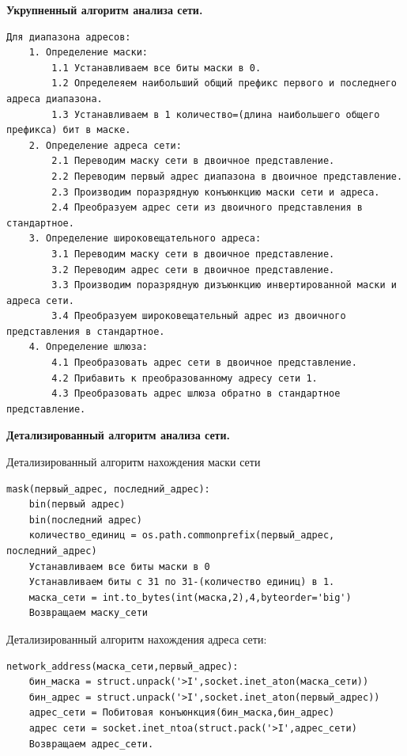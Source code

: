 \documentclass[a4paper]{article}
\begin{document}
\textbf{Укрупненный алгоритм анализа сети.}

\begin{verbatim}
Для диапазона адресов:
    1. Определение маски:
        1.1 Устанавливаем все биты маски в 0.
        1.2 Определеяем наибольший общий префикс первого и последнего адреса диапазона.
        1.3 Устанавливаем в 1 количество=(длина наибольшего общего префикса) бит в маске. 
    2. Определение адреса сети:
        2.1 Переводим маску сети в двоичное представление.
        2.2 Переводим первый адрес диапазона в двоичное представление.
        2.3 Производим поразрядную конъюнкцию маски сети и адреса.
        2.4 Преобразуем адрес сети из двоичного представления в стандартное.
    3. Определение широковещательного адреса:
        3.1 Переводим маску сети в двоичное представление.
        3.2 Переводим адрес сети в двоичное представление.
        3.3 Производим поразрядную дизъюнкцию инвертированной маски и адреса сети.
        3.4 Преобразуем широковещательный адрес из двоичного представления в стандартное.
    4. Определение шлюза:
        4.1 Преобразовать адрес сети в двоичное представление.
        4.2 Прибавить к преобразованному адресу сети 1.
        4.3 Преобразовать адрес шлюза обратно в стандартное представление.
\end{verbatim}

\textbf{Детализированный алгоритм анализа сети.}

Детализированный алгоритм нахождения маски сети

\begin{verbatim}
mask(первый_адрес, последний_адрес):
    bin(первый адрес)
    bin(последний адрес)
    количество_единиц = os.path.commonprefix(первый_адрес, последний_адрес)
    Устанавливаем все биты маски в 0
    Устанавливаем биты с 31 по 31-(количество единиц) в 1.
    маска_сети = int.to_bytes(int(маска,2),4,byteorder='big')
    Возвращаем маску_сети
\end{verbatim} 

Детализированный алгоритм нахождения адреса сети:

\begin{verbatim}
network_address(маска_сети,первый_адрес):
    бин_маска = struct.unpack('>I',socket.inet_aton(маска_сети))
    бин_адрес = struct.unpack('>I',socket.inet_aton(первый_адрес))
    адрес_сети = Побитовая конъюнкция(бин_маска,бин_адрес)
    адрес сети = socket.inet_ntoa(struct.pack('>I',адрес_сети)
    Возвращаем адрес_сети.
\end{verbatim}
\end{document}
